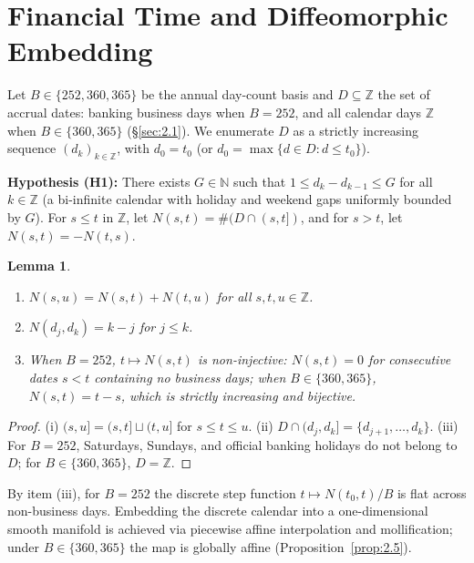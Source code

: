 \documentclass[11pt, a4paper]{article}
\theoremstyle{definition}
\theoremstyle{plain}
\newtheorem{lema}[definicao]{Lemma}
\theoremstyle{remark}
\begin{document}
\section{Financial Time and Diffeomorphic Embedding}\label{sec:2}

Let $B \in \{252, 360, 365\}$ be the annual day-count basis and $D \subseteq \mathbb{Z}$ the set of accrual dates: banking business days when $B = 252$, and all calendar days $\mathbb{Z}$ when $B \in \{360, 365\}$ (\S\ref{sec:2.1}). We enumerate $D$ as a strictly increasing sequence $(d_k)_{k \in \mathbb{Z}}$, with $d_0 = t_0$ (or $d_0 = \max\{d \in D : d \le t_0\}$).

\medskip\noindent\textbf{Hypothesis (H1):} There exists $G \in \mathbb{N}$ such that $1 \le d_k - d_{k-1} \le G$ for all $k \in \mathbb{Z}$ (a bi-infinite calendar with holiday and weekend gaps uniformly bounded by $G$). For $s \le t$ in $\mathbb{Z}$, let $N(s,t) = \#(D \cap (s,t])$, and for $s > t$, let $N(s,t) = -N(t,s)$.

\begin{lema}\label{lem:2.1}
\begin{enumerate}[label=(\roman*)]
    \item $N(s,u) = N(s,t) + N(t,u)$ for all $s, t, u \in \mathbb{Z}$.
    \item $N(d_j, d_k) = k - j$ for $j \le k$.
    \item When $B = 252$, $t \mapsto N(s,t)$ is non-injective: $N(s,t) = 0$ for consecutive dates $s < t$ containing no business days; when $B \in \{360, 365\}$, $N(s,t) = t - s$, which is strictly increasing and bijective.
\end{enumerate}
\end{lema}
\begin{proof}
(i) $(s,u] = (s,t] \sqcup (t,u]$ for $s \le t \le u$. (ii) $D \cap (d_j, d_k] = \{d_{j+1}, \dots, d_k\}$. (iii) For $B = 252$, Saturdays, Sundays, and official banking holidays do not belong to $D$; for $B \in \{360, 365\}$, $D = \mathbb{Z}$.
\end{proof}

By item (iii), for $B = 252$ the discrete step function $t \mapsto N(t_0, t)/B$ is flat across non-business days. Embedding the discrete calendar into a one-dimensional smooth manifold is achieved via piecewise affine interpolation and mollification; under $B \in \{360, 365\}$ the map is globally affine (Proposition~\ref{prop:2.5}).
\end{document}
